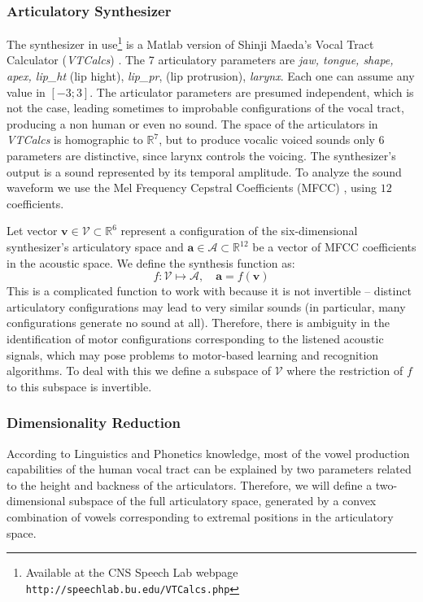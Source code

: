 \subsubsection{Articulatory Synthesizer}
The synthesizer in use\footnote{Available at the CNS Speech Lab
  webpage \texttt{http://speechlab.bu.edu/VTCalcs.php}} is a Matlab
version of Shinji Maeda's Vocal Tract Calculator (\emph{VTCalcs})
\cite{MAEDA}. The 7 articulatory parameters are \emph{jaw, tongue,
  shape, apex, lip\_ht} (lip hight), \emph{lip\_pr}, (lip protrusion),
\emph{larynx}. Each one can assume any value in $[-3;3]$. The
articulator parameters are presumed independent, which is not the
case, leading sometimes to improbable configurations of the vocal
tract, producing a non human or even no sound.
The space of the articulators in  \emph{VTCalcs} is homographic to
$\mathds{R}^{7}$, but to produce vocalic voiced sounds only 6
parameters are distinctive, since larynx controls the voicing. The
synthesizer's output is a sound represented by its temporal
amplitude. To analyze the sound waveform we use the Mel Frequency
Cepstral Coefficients (MFCC) \cite{Davis80}, using $12$ coefficients.

Let vector $\mathbf{v} \in \mathcal{V} \subset \mathds{R}^{6}$
represent a configuration of the six-dimensional synthesizer's
articulatory space and  $\mathbf{a} \in \mathcal{A} \subset
\mathds{R}^{12} $ be a vector of MFCC coefficients in the acoustic
space. We define the synthesis function as:
\begin{equation}
f : \mathcal{V} \mapsto \mathcal{A}, \quad \mathbf{a} = f( \mathbf{v})
\end{equation}
This is a complicated function to work with because it is not
invertible -- distinct articulatory configurations may lead to very
similar sounds (in particular, many configurations generate no sound
at all). Therefore, there is ambiguity in the identification of motor
configurations corresponding to the listened acoustic signals, which
may pose problems to motor-based learning and recognition
algorithms. To deal with this we define a subspace of $\mathcal{V}$
where the restriction of $f$ to this subspace is invertible.

\subsubsection{Dimensionality Reduction}
According to Linguistics and
Phonetics knowledge, most of the vowel production capabilities of the
human vocal tract can be explained by two parameters related to the
height and backness of the articulators. Therefore, we will define a
two-dimensional subspace of the full articulatory space, generated by
a convex combination of vowels corresponding to extremal positions in
the articulatory space.

